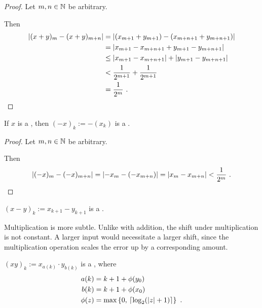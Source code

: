 \documentclass[leqno]{report}
\begin{document}
\begin{proof}
    Let $m, n \in \mathbb{N}$ be arbitrary.

    Then
    \begin{align*}
        \left| (x+y)_m - (x+y)_{m+n} \right|
        &= \left| (x_{m+1} + y_{m+1}) - (x_{m+n+1} + y_{m+n+1}) \right| \\
        &= \left| x_{m+1} - x_{m+n+1} + y_{m+1} - y_{m+n+1} \right| \\
        &\leq \left| x_{m+1} - x_{m+n+1} \right| + \left| y_{m+1} - y_{m+n+1} \right| \\
        &< \frac{1}{2^{m+1}} + \frac{1}{2^{m+1}} \\
        &= \frac{1}{2^m}
        \ . \qedhere
    \end{align*}
\end{proof}

\begin{Proposition}[Negation]
    \label{neg}
    If $x$ is a \FCCS, then $(-x)_k := -(x_k)$ is a \FCCS.
\end{Proposition}

\begin{proof}
    Let $m, n \in \mathbb{N}$ be arbitrary.

    Then
    \[
        \left| (-x)_m - (-x)_{m+n} \right|
        = \left| -x_m - (-x_{m+n}) \right|
        = \left| x_m - x_{m+n} \right|
        < \frac{1}{2^m}
        \ . \qedhere
    \]
\end{proof}

\begin{Corollary}[Subtraction]
    $(x-y)_k := x_{k+1} - y_{k+1}$ is a \FCCS.
\end{Corollary}

Multiplication is more subtle. Unlike with addition, the shift under multiplication is not constant. A larger input would necessitate a larger shift, since the multiplication operation scales the error up by a corresponding amount.

\begin{Proposition}[Multiplication]
    $(xy)_k := x_{a(k)} \cdot y_{b(k)}$ is a \FCCS, where
    \begin{align*}
        a(k) &= k + 1 + \phi(y_0) \\
        b(k) &= k + 1 + \phi(x_0) \\
        \phi(z) &= \max \left\{  0,\, \left\lceil \log_2(\left| z \right| + 1) \right\rceil  \right\}
        \ .
    \end{align*}
\end{Proposition}
\end{document}

